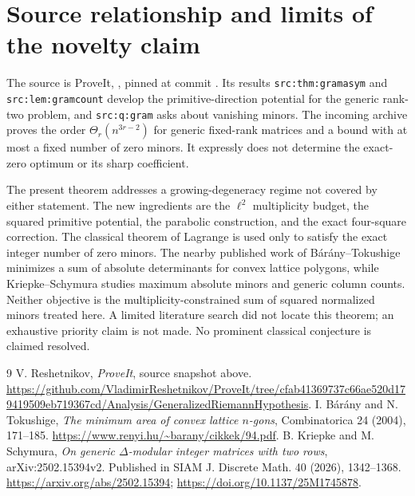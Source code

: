 \documentclass[11pt]{article}
\theoremstyle{remark}\newtheorem{remark}[theorem]{Remark}
\begin{document}
\section{Source relationship and limits of the novelty claim}
The source is ProveIt, , pinned at commit . Its results \texttt{src:thm:gramasym} and \texttt{src:lem:gramcount} develop the primitive-direction potential for the generic rank-two problem, and \texttt{src:q:gram} asks about vanishing minors. The incoming archive  proves the order $\Theta_r(n^{3r-2})$ for generic fixed-rank matrices and a bound with at most a fixed number of zero minors. It expressly does not determine the exact-zero optimum or its sharp coefficient.

The present theorem addresses a growing-degeneracy regime not covered by either statement. The new ingredients are the $\ell^2$ multiplicity budget, the squared primitive potential, the parabolic construction, and the exact four-square correction. The classical theorem of Lagrange is used only to satisfy the exact integer number of zero minors. The nearby published work of B\'ar\'any--Tokushige minimizes a sum of absolute determinants for convex lattice polygons, while Kriepke--Schymura studies maximum absolute minors and generic column counts. Neither objective is the multiplicity-constrained sum of squared normalized minors treated here. A limited literature search did not locate this theorem; an exhaustive priority claim is not made. No prominent classical conjecture is claimed resolved.

\begin{thebibliography}{9}
 V. Reshetnikov, \emph{ProveIt}, source snapshot above. \url{https://github.com/VladimirReshetnikov/ProveIt/tree/cfab41369737c66ae520d179419509eb719367cd/Analysis/GeneralizedRiemannHypothesis}.
 I. B\'ar\'any and N. Tokushige, \emph{The minimum area of convex lattice $n$-gons}, Combinatorica 24 (2004), 171--185. \url{https://www.renyi.hu/~barany/cikkek/94.pdf}.
 B. Kriepke and M. Schymura, \emph{On generic $\Delta$-modular integer matrices with two rows}, arXiv:2502.15394v2. Published in SIAM J. Discrete Math. 40 (2026), 1342--1368. \url{https://arxiv.org/abs/2502.15394}; \url{https://doi.org/10.1137/25M1745878}.
\end{thebibliography}
\end{document}
